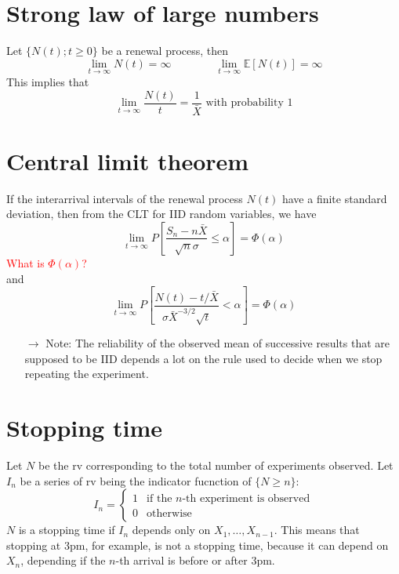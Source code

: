 \documentclass[12pt, openany]{report}
\newcommand{\E}{\mathbb{E}}
\theoremstyle{definition}
\begin{document}
\section{Strong law of large numbers}
Let $\{N(t);t\ge 0\}$ be a renewal process, then 
\begin{equation}
  \lim_{t\to \infty} N(t) = \infty \qquad \qquad \lim_{t\to \infty} \E[N(t)] = \infty 
\end{equation}
This implies that 
\begin{equation}
  \lim_{t\to \infty} \frac{N(t)}{t} = \frac{1}{\bar X} \text{ with probability 1}
\end{equation}
\section{Central limit theorem}
If the interarrival intervals of the renewal process $N(t)$ have a finite standard deviation, then from the CLT for IID random variables, we have 
\begin{equation}
  \lim_{t\to \infty} P\left[\frac{S_n-n\bar X}{\sqrt{n}\sigma}\le \alpha\right] = \Phi(\alpha)
\end{equation}
\textcolor{red}{What is $\Phi(\alpha)$?}\\
and 
\begin{equation}
  \lim_{t\to \infty} P\left[\frac{N(t)-t/\bar X}{\sigma \bar X^{-3/2}\sqrt{t}}<\alpha \right] = \Phi(\alpha)
\end{equation}
\begin{itemize}
  \item [$\to$] Note: The reliability of the observed mean of successive results that are supposed to be IID depends a lot on the rule used to decide when we stop repeating the experiment.
\end{itemize}
\section{Stopping time}
Let $N$ be the rv corresponding to the total number of experiments observed. Let $I_n$ be a series of rv being the indicator fucnction of $\{N\ge n\}$:
\begin{equation}
  I_n = \begin{cases}
    1 & \text{if the $n$-th experiment is observed}\\
    0 & \text{otherwise}
  \end{cases}
\end{equation}
$N$ is a stopping time if $I_n$ depends only on $X_1,\dots,X_{n-1}$. This means that stopping at 3pm, for example, is not a stopping time, because it can depend on $X_n$, depending if the $n$-th arrival is before or after 3pm.\\
\end{document}

